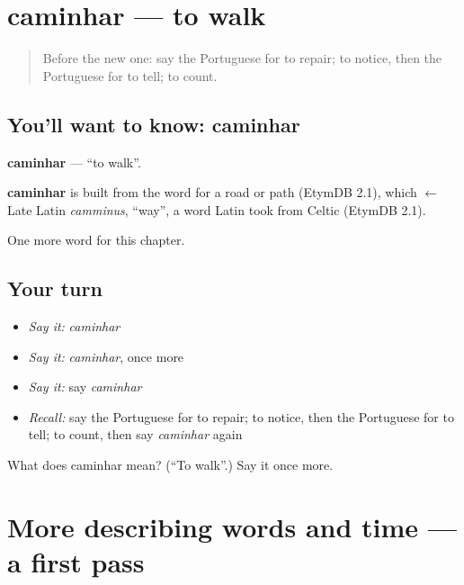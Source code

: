 \section[caminhar]{caminhar — to walk}

\label{lesson:PT-C133-caminhar}



\begin{quote}
Before the new one: say the Portuguese for to repair; to notice, then the Portuguese for to tell; to count.
\end{quote}

\subsection*{You'll want to know: caminhar}
\textbf{caminhar} — \textquotedblleft{}to walk\textquotedblright{}.

\begin{cousinweb}
\textbf{caminhar} is built from the word for a road or path (EtymDB 2.1), which $\leftarrow$ Late Latin \emph{camminus}, \textquotedblleft{}way\textquotedblright{}, a word Latin took from Celtic (EtymDB 2.1).
\end{cousinweb}

\begin{grammarlens}[title={What you've built}]
One more word for this chapter.
\end{grammarlens}

\subsection*{Your turn}
\begin{itemize}
\raggedright
  \item \emph{Say it:} \emph{caminhar}
  \item \emph{Say it:} \emph{caminhar}, once more
  \item \emph{Say it:} say \emph{caminhar}
  \item \emph{Recall:} say the Portuguese for to repair; to notice, then the Portuguese for to tell; to count, then say \emph{caminhar} again
\end{itemize}

\begin{tcolorbox}[breakable,colback=teal!4,colframe=teal!35!black,title={Before you move on}]
What does caminhar mean? (\textquotedblleft{}To walk\textquotedblright{}.) Say it once more.
\end{tcolorbox}
\section[(dialogue)]{More describing words and time — a first pass}

